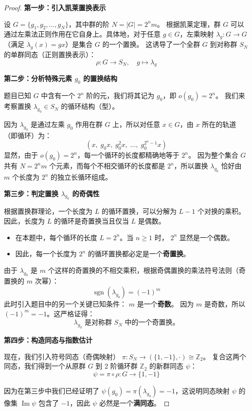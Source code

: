 \documentclass[]{article}
\begin{document}
\begin{proof}
\bigskip
\noindent \textbf{第一步：引入凯莱置换表示}

设 $G = \{g_1, g_2, \dots, g_N\}$，其中群的阶 $N = |G| = 2^n m$。
根据凯莱定理，群 $G$ 可以通过左乘法正则作用在它自身上。具体地，对于任意 $g \in G$，左乘映射 $\lambda_g: G \to G$（满足 $\lambda_g(x) = gx$）是集合 $G$ 的一个置换。
这诱导了一个全群 $G$ 到对称群 $S_N$ 的单群同态（正则置换表示）：
\[ \rho: G \longrightarrow S_N, \quad g \mapsto \lambda_g \]

\bigskip
\noindent \textbf{第二步：分析特殊元素 $g_0$ 的置换结构}

题目已知 $G$ 中含有一个 $2^n$ 阶的元，我们将其记为 $g_0$，即 $o(g_0) = 2^n$。
我们来考察置换 $\lambda_{g_0} \in S_N$ 的循环结构（型）。

因为 $\lambda_{g_0}$ 是通过左乘 $g_0$ 作用在群 $G$ 上，所以对任意 $x \in G$，由 $x$ 所在的轨道（即循环）为：
\[ (x, \; g_0x, \; g_0^2x, \; \dots, \; g_0^{2^n-1}x) \]
显然，由于 $o(g_0) = 2^n$，每一个循环的长度都精确地等于 $2^n$。
因为整个集合 $G$ 共有 $N = 2^n m$ 个元素，而每个不相交循环的长度都是 $2^n$，所以置换 $\lambda_{g_0}$ 恰好由 $m$ 个长度为 $2^n$ 的独立长循环组成。

\bigskip
\noindent \textbf{第三步：判定置换 $\lambda_{g_0}$ 的奇偶性}

根据置换群理论，一个长度为 $L$ 的循环置换，可以分解为 $L-1$ 个对换的乘积。因此，长度为 $L$ 的循环是奇置换当且仅当 $L$ 是偶数。
\begin{itemize}
	\item 在本题中，每个循环的长度 $L = 2^n$。当 $n \ge 1$ 时， $2^n$ 显然是一个偶数。
	\item 因此，每一个长度为 $2^n$ 的循环置换都必定是一个\textbf{奇置换}。
\end{itemize}

由于 $\lambda_{g_0}$ 是 $m$ 个这样的奇置换的不相交乘积，根据奇偶置换的乘法符号法则（奇置换的 $m$ 次幂）：
\[ \operatorname{sgn}(\lambda_{g_0}) = (-1)^m \]
此时引入题目中的另一个关键已知条件： $m$ 是一个\textbf{奇数}。
因为 $m$ 是奇数，所以 $(-1)^m = -1$。这严格证得：
\[ \lambda_{g_0} \text{ 是对称群 } S_N \text{ 中的一个奇置换。} \]

\bigskip
\noindent \textbf{第四步：构造同态与指数估计}

现在，我们引入符号同态（奇偶映射） $\pi: S_N \to (\{1, -1\}, \cdot) \cong \mathbb{Z}_2$。
复合这两个同态，我们得到一个从原群 $G$ 到 2 阶循环群 $\mathbb{Z}_2$ 的新群同态 $\psi$：
\[ \psi = \pi \circ \rho: G \longrightarrow \{1, -1\} \]

因为在第三步中我们已经证明了 $\psi(g_0) = \pi(\lambda_{g_0}) = -1$，这说明同态映射 $\psi$ 的像集 $\operatorname{Im}\psi$ 包含了 $-1$，因此 $\psi$ 必然是一个\textbf{满同态}。


\end{proof}
\end{document}
